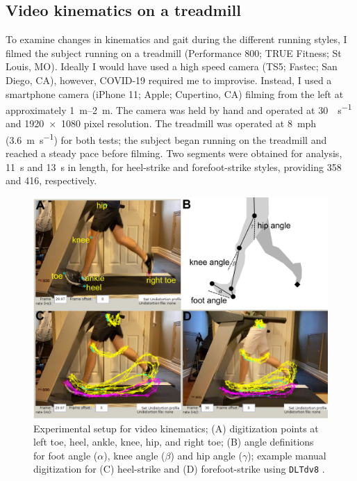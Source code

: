 \subsection{Video kinematics on a treadmill}
To examine changes in kinematics and gait during the different running styles, I filmed the subject running on a treadmill (Performance 800; TRUE Fitness; St Louis, MO). Ideally I would have used a high speed camera (TS5; Fastec; San Diego, CA), however, COVID-19 required me to improvise. Instead, I used a smartphone camera (iPhone 11; Apple; Cupertino, CA) filming from the left at approximately \SIrange{1}{2}{\meter}. The camera was held by hand and operated at \SI{30}{\frame\per\second} and \num{1920x1080} pixel resolution. The treadmill was operated at \SI{8}{mph} (\SI{3.6}{\meter\per\second}) for both tests; the subject began running on the treadmill and reached a steady pace before filming.  Two segments were obtained for analysis, \SI{11}{\second} and \SI{13}{\second} in length, for heel-strike and forefoot-strike styles, providing \SI{358}{\frame} and \SI{416}{\frame}, respectively.
\begin{figure}
\begin{center}
\includegraphics{figures/fig-methods-2.png}
\end{center}
\caption{Experimental setup for video kinematics; (A) digitization points at left toe, heel, ankle, knee, hip, and right toe; (B) angle definitions for foot angle ($\alpha$), knee angle ($\beta$) and hip angle ($\gamma$); example manual digitization for (C) heel-strike and (D) forefoot-strike using \lstinline{DLTdv8} \citep{hedrick2008software}.}
\label{fig:methods:kinematics}
\end{figure}


